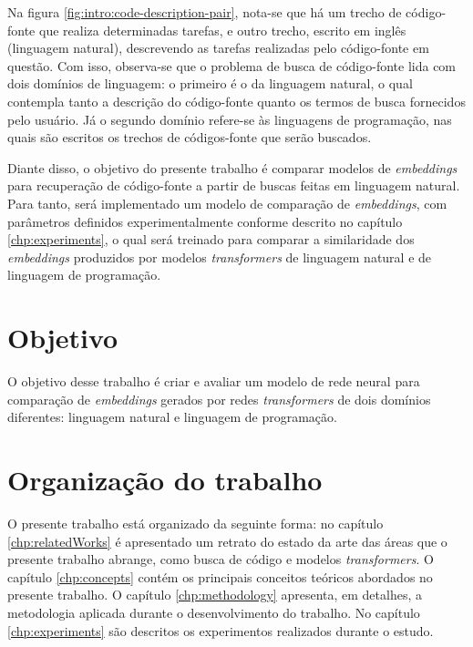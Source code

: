 Na figura \ref{fig:intro:code-description-pair}, nota-se que há um trecho de código-fonte que realiza determinadas tarefas, e outro trecho, escrito em inglês (linguagem natural), descrevendo as tarefas realizadas pelo código-fonte em questão. Com isso, observa-se que o problema de busca de código-fonte lida com dois domínios de linguagem: o primeiro é o da linguagem natural, o qual contempla tanto a descrição do código-fonte quanto os termos de busca fornecidos pelo usuário. Já o segundo domínio refere-se às linguagens de programação, nas quais são escritos os trechos de códigos-fonte que serão buscados.

Diante disso, o objetivo do presente trabalho é comparar modelos de \textit{embeddings} para recuperação de código-fonte a partir de buscas feitas em linguagem natural. Para tanto, será implementado um modelo de comparação de \textit{embeddings}, com parâmetros definidos experimentalmente conforme descrito no capítulo \ref{chp:experiments}, o qual será treinado para comparar a similaridade dos \textit{embeddings} produzidos por modelos \textit{transformers} de linguagem natural e de linguagem de programação.

\section{Objetivo}
O objetivo desse trabalho é criar e avaliar um modelo de rede neural para comparação de \textit{embeddings} gerados por redes \textit{transformers} de dois domínios diferentes: linguagem natural e linguagem de programação. 

\section{Organização do trabalho}
O presente trabalho está organizado da seguinte forma: no capítulo \ref{chp:relatedWorks} é apresentado um retrato do estado da arte das áreas que o presente trabalho abrange, como busca de código e modelos \textit{transformers}. O capítulo \ref{chp:concepts} contém os principais conceitos teóricos abordados no presente trabalho. O capítulo \ref{chp:methodology} apresenta, em detalhes, a metodologia aplicada durante o desenvolvimento do trabalho. No capítulo \ref{chp:experiments} são descritos os experimentos realizados durante o estudo.
